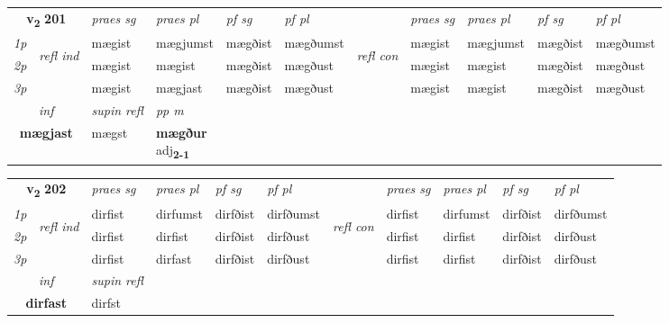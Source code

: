 \noindent
\begin{tabular}{lllllllllll} \toprule
\multicolumn{2}{c}{\textbf{v{\textsubscript{2}}} \Large{\textbf{201}}}  &  \textit{praes sg}  & \textit{praes pl}  &\textit{ pf sg} & \textit{pf pl} &  &  \textit{praes sg}  & \textit{praes pl}  & \textit{pf sg} & \textit{pf pl } \\*
	\cmidrule{3-6} \cmidrule{8-11}
 {\textit{1p}} & \multirow{3}{*}{\begin{turn}{90}\textit{refl ind}\end{turn}}  & mægist & mægjumst & mægðist & mægðumst & \multirow{3}{*}{\begin{turn}{90}\textit{refl con}\end{turn}}  &mægist & mægjumst & mægðist & mægðumst \\*
 {\textit{2p}} &  & mægist & mægist & mægðist & mægðust & &mægist & mægist & mægðist & mægðust \\*
 {\textit{3p}}  & & mægist & mægjast & mægðist & mægðust & & mægist & mægist& mægðist & mægðust \\*
\cmidrule{3-6} \cmidrule{8-11}

   \multicolumn{2}{c}{\textit{inf}}       & \textit{supin refl} & \textit{pp m} \\*
  \multicolumn{2}{c}{\textbf{mægjast}}        & mægst & \specialcell{\textbf{mægður} \\ adj\textbf{\textsubscript{2-1}}} \\*
\end{tabular}

\noindent
\begin{tabular}{lllllllllll} \toprule
\multicolumn{2}{c}{\textbf{v{\textsubscript{2}}} \Large{\textbf{202}}}  &  \textit{praes sg}  & \textit{praes pl}  &\textit{ pf sg} & \textit{pf pl} &  &  \textit{praes sg}  & \textit{praes pl}  & \textit{pf sg} & \textit{pf pl } \\*
	\cmidrule{3-6} \cmidrule{8-11}
 {\textit{1p}} & \multirow{3}{*}{\begin{turn}{90}\textit{refl ind}\end{turn}}  & dirfist & dirfumst & dirfðist & dirfðumst & \multirow{3}{*}{\begin{turn}{90}\textit{refl con}\end{turn}}  &dirfist & dirfumst & dirfðist & dirfðumst \\*
 {\textit{2p}} &  & dirfist & dirfist & dirfðist & dirfðust & &dirfist & dirfist & dirfðist & dirfðust \\*
 {\textit{3p}}  & & dirfist & dirfast & dirfðist & dirfðust & & dirfist & dirfist& dirfðist & dirfðust \\*
\cmidrule{3-6} \cmidrule{8-11}

   \multicolumn{2}{c}{\textit{inf}}       & \textit{supin refl}  \\*
  \multicolumn{2}{c}{\textbf{dirfast}}        & dirfst  \\*
\end{tabular}

